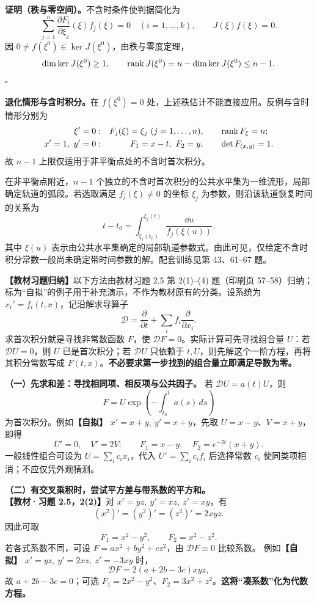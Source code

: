 \textbf{证明（秩与零空间）。}不含时条件使判据简化为
\[
\sum_{j=1}^n\frac{\partial F_i}{\partial\xi_j}(\xi)f_j(\xi)=0
\quad(i=1,\ldots,k),\qquad J(\xi)f(\xi)=0.
\]
因 $0\ne f(\xi^0)\in\ker J(\xi^0)$，由秩与零度定理，
\[
\dim\ker J(\xi^0)\ge1,\qquad
\operatorname{rank} J(\xi^0)=n-\dim\ker J(\xi^0)\le n-1.
\]
\hfill$\square$

\textbf{退化情形与含时积分。}在 $f(\xi^0)=0$ 处，上述秩估计不能直接应用。反例与含时情形分别为
\[
\begin{aligned}
\xi'=0 &: &F_j(\xi)=\xi_j\ (j=1,\ldots,n),&\qquad \operatorname{rank} F_\xi=n;\\
x'=1,\ y'=0 &: &F_1=x-t,\ F_2=y,&\qquad \det F_{(x,y)}=1.
\end{aligned}
\]
故 $n-1$ 上限仅适用于非平衡点处的不含时首次积分。

在非平衡点附近，$n-1$ 个独立的不含时首次积分的公共水平集为一维流形，局部确定轨道的弧段。若选取满足 $f_j(\xi)\ne0$ 的坐标 $\xi_j$ 为参数，则沿该轨道恢复时间的关系为
\[
t-t_0=\int_{\xi_j(t_0)}^{\xi_j(t)}\frac{\dd u}{f_j(\xi(u))}.
\]
其中 $\xi(u)$ 表示由公共水平集确定的局部轨道参数式。由此可见，仅给定不含时积分常数一般尚未确定带时间参数的解。配套训练见第 43、61--67 题。

\textbf{【教材习题归纳】}以下方法由教材习题 2.5 第 2(1)--(4) 题（印刷页 57--58）归纳；标为“自拟”的例子用于补充演示，不作为教材原有的分类。设系统为 $x_i'=f_i(t,x)$，记沿解求导算子
\[
\mathcal D=\frac{\partial}{\partial t}+\sum_i f_i\frac{\partial}{\partial x_i}.
\]
求首次积分就是寻找非常数函数 $F$，使 $\mathcal DF=0$。实际计算可先寻找组合量 $U$：若 $\mathcal DU=0$，则 $U$ 已是首次积分；若 $\mathcal DU$ 只依赖于 $t,U$，则先解这个一阶方程，再将其积分常数写成 $F(t,x)$。\textbf{不必要求第一步找到的组合量立即满足导数为零。}

\textbf{（一）先求和差：寻找相同项、相反项与公共因子。}
若 $\mathcal DU=a(t)U$，则
\[
F=U\exp\left(-\int_{t_0}^{t}a(s)\,ds\right)
\]
为首次积分。例如\textbf{【自拟】} $x'=x+y,\ y'=x+y$，先取 $U=x-y$、$V=x+y$，即得
\[
U'=0,\quad V'=2V;\qquad F_1=x-y,\quad F_2=e^{-2t}(x+y).
\]
一般线性组合可设为 $U=\sum_i c_ix_i$，代入 $U'=\sum_i c_if_i$ 后选择常数 $c_i$ 使同类项相消；不应仅凭外观猜测。

\textbf{（二）有交叉乘积时，尝试平方差与带系数的平方和。}
\textbf{【教材·习题 2.5，2(2)】}对 $x'=yz,\ y'=xz,\ z'=xy$，有
\[
(x^2)'=(y^2)'=(z^2)'=2xyz.
\]
因此可取
\[
\boxed{F_1=x^2-y^2,\qquad F_2=x^2-z^2.}
\]
若各式系数不同，可设 $F=ax^2+by^2+cz^2$，由 $\mathcal DF\equiv0$ 比较系数。
例如\textbf{【自拟】} $x'=yz,\ y'=2xz,\ z'=-3xy$ 时，
\[
\mathcal DF=2(a+2b-3c)xyz,
\]
故 $a+2b-3c=0$；可选 $F_1=2x^2-y^2$、$F_2=3x^2+z^2$。\textbf{这将“凑系数”化为代数方程。}

